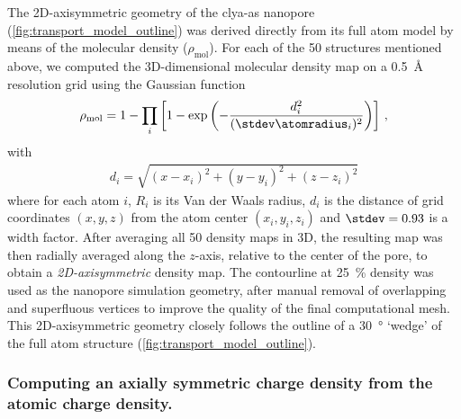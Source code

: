 The 2D-axisymmetric geometry of the \gls{clya-as} nanopore (\cref{fig:transport_model_outline}) was derived
directly from its full atom model by means of the molecular density ($\rho_\text{mol}$). For each of the 50
structures mentioned above, we computed the 3D-dimensional molecular density map on a \SI{0.5}{\angstrom}
resolution grid using the Gaussian function~\cite{Li-2013}
%
\begin{align}\label{eq:denspore}
  \rho_\text{mol} = 1 - \displaystyle\prod_{i} \left[ 1 - 
    \exp{\left(-\dfrac{d_i^2}{(\stdev\atomradius_{i})^2}\right)} \right]
    \text{\,,}
\end{align}
%
with
%
\begin{align}
  d_i = \sqrt{(x-x_i)^2 + (y-y_i)^2 + (z-z_i)^2}
\end{align}
%
where for each atom $i$, $R_i$ is its Van der Waals radius, $d_i$ is the distance of grid coordinates $(x, y,
z)$ from the atom center $(x_i, y_i, z_i)$ and $\stdev = 0.93$ is a width factor. After averaging all 50
density maps in 3D, the resulting map was then radially averaged along the $z$-axis, relative to the center of
the pore, to obtain a \emph{2D-axisymmetric} density map. The contourline at \SI{25}{\percent} density was
used as the nanopore simulation geometry, after manual removal of overlapping and superfluous vertices to
improve the quality of the final computational mesh. This 2D-axisymmetric geometry closely follows the outline
of a \SI{30}{\degree} `wedge' of the full atom structure (\cref{fig:transport_model_outline}).

\subsubsection{Computing an axially symmetric charge density from the atomic charge density.}
%

